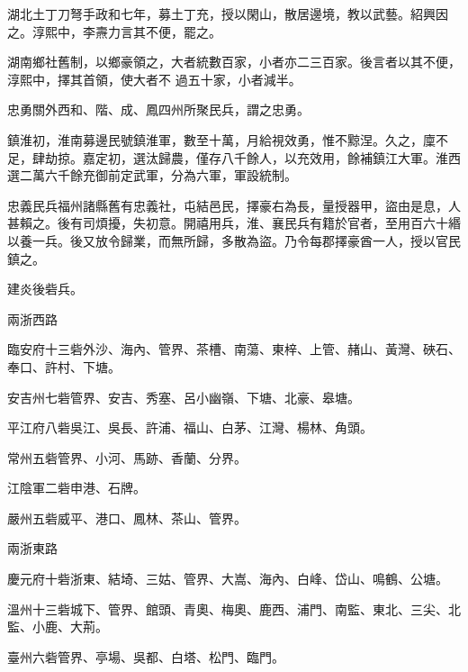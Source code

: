 \begin{pinyinscope}
 湖北土丁刀弩手政和七年，募土丁充，授以閑山，散居邊境，教以武藝。紹興因之。淳熙中，李燾力言其不便，罷之。



 湖南鄉社舊制，以鄉豪領之，大者統數百家，小者亦二三百家。後言者以其不便，淳熙中，擇其首領，使大者不
 過五十家，小者減半。



 忠勇關外西和、階、成、鳳四州所聚民兵，謂之忠勇。



 鎮淮初，淮南募邊民號鎮淮軍，數至十萬，月給視效勇，惟不黥涅。久之，廩不足，肆劫掠。嘉定初，選汰歸農，僅存八千餘人，以充效用，餘補鎮江大軍。淮西選二萬六千餘充御前定武軍，分為六軍，軍設統制。



 忠義民兵福州諸縣舊有忠義社，屯結邑民，擇豪右為長，量授器甲，盜由是息，人甚賴之。後有司煩擾，失初意。開禧用兵，淮、襄民兵有籍於官者，至用百六十緡以養一兵。後又放令歸業，而無所歸，多散為盜。乃令每郡擇豪酋一人，授以官民鎮之。



 建炎後砦兵。



 兩浙西路



 臨安府十三砦外沙、海內、管界、茶槽、南蕩、東梓、上管、赭山、黃灣、硤石、奉口、許村、下塘。



 安吉州七砦管界、安吉、秀塞、呂小幽嶺、下塘、北豪、皋塘。



 平江府八砦吳江、吳長、許浦、福山、白茅、江灣、楊林、角頭。



 常州五砦管界、小河、馬跡、香蘭、分界。



 江陰軍二砦申港、石牌。



 嚴州五砦威平、港口、鳳林、茶山、管界。



 兩浙東路



 慶元府十砦浙東、結埼、三姑、管界、大嵩、海內、白峰、岱山、鳴鶴、公塘。



 溫州十三砦城下、管界、館頭、青奧、梅奧、鹿西、浦門、南監、東北、三尖、北監、小鹿、大荊。



 臺州六砦管界、亭場、吳都、白塔、松門、臨門。




\end{pinyinscope}
